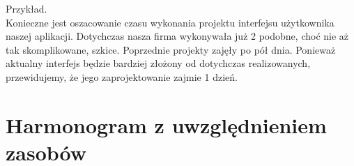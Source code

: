 	Przykład.\\
Konieczne jest oszacowanie czasu wykonania projektu interfejsu użytkownika naszej aplikacji. Dotychczas nasza firma wykonywała już 2 podobne, choć nie aż tak skomplikowane, szkice. Poprzednie projekty zajęły po pół dnia. Ponieważ aktualny interfejs będzie bardziej złożony od dotychczas realizowanych, przewidujemy, że jego zaprojektowanie zajmie 1 dzień.



\section{Harmonogram z uwzględnieniem zasobów}




